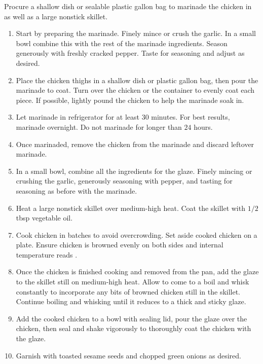 \documentclass{article}
\begin{document}
\instructions
Procure a shallow dish or sealable plastic gallon bag to marinade the chicken in as well as a large nonstick skillet.
\begin{enumerate}
    \item Start by preparing the marinade. Finely mince or crush the garlic. In a small bowl combine this with the rest of the marinade ingredients. Season generously with freshly cracked pepper. Taste for seasoning and adjust as desired.
    \item Place the chicken thighs in a shallow dish or plastic gallon bag, then pour the marinade to coat. Turn over the chicken or the container to evenly coat each piece. If possible, lightly pound the chicken to help the marinade soak in.
    \item Let marinade in refrigerator for at least $30$ minutes. For best results, marinade overnight. Do not marinade for longer than $24$ hours.
    \item Once marinaded, remove the chicken from the marinade and discard leftover marinade.
    \item In a small bowl, combine all the ingredients for the glaze. Finely mincing or crushing the garlic, generously seasoning with pepper, and tasting for seasoning as before with the marinade.
    \item Heat a large nonstick skillet over medium-high heat. Coat the skillet with $1/2$ tbsp vegetable oil.
    \item Cook chicken in batches to avoid overcrowding. Set aside cooked chicken on a plate. Ensure chicken is browned evenly on both sides and internal temperature reads .
    \item Once the chicken is finished cooking and removed from the pan, add the glaze to the skillet still on medium-high heat. Allow to come to a boil and whisk constantly to incorporate any bits of browned chicken still in the skillet. Continue boiling and whisking until it reduces to a thick and sticky glaze.
    \item Add the cooked chicken to a bowl with sealing lid, pour the glaze over the chicken, then seal and shake vigorously to thoroughly coat the chicken with the glaze.
    \item Garnish with toasted sesame seeds and chopped green onions as desired.
\end{enumerate}
\newpage
\end{document}
